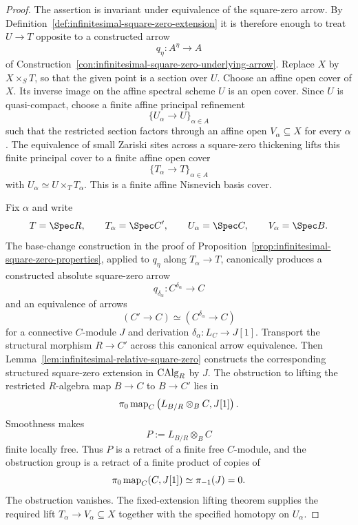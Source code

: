 \begin{proof}
The assertion is invariant under equivalence of the square-zero arrow.  By
Definition~\ref{def:infinitesimal-square-zero-extension} it is therefore
enough to treat \(U\to T\) opposite to a constructed arrow
\[
    q_\eta:A^\eta\longrightarrow A
\]
of Construction~\ref{con:infinitesimal-square-zero-underlying-arrow}.
Replace $X$ by $X\times_ST$, so that the given point is a section over $U$.
Choose an affine open cover of $X$.  Its inverse image on the affine spectral
scheme $U$ is an open cover.  Since $U$ is quasi-compact, choose a finite
affine principal refinement
\[
    \{U_\alpha\to U\}_{\alpha\in A}
\]
such that the restricted section factors through an affine open
$V_\alpha\subseteq X$ for every $\alpha$.  The equivalence of small Zariski
sites across a square-zero thickening lifts this finite principal cover to a
finite affine open cover
\[
    \{T_\alpha\to T\}_{\alpha\in A}
\]
with $U_\alpha\simeq U\times_TT_\alpha$.  This is a finite affine Nisnevich
basis cover.

Fix $\alpha$ and write
\[
    T=\Spec R,
    \qquad
    T_\alpha=\Spec C',
    \qquad
    U_\alpha=\Spec C,
    \qquad
    V_\alpha=\Spec B.
\]
The base-change construction in the proof of
Proposition~\ref{prop:infinitesimal-square-zero-properties}, applied to
\(q_\eta\) along \(T_\alpha\to T\), canonically produces a constructed
absolute square-zero arrow
\[
    q_{\delta_\alpha}:C^{\delta_\alpha}\longrightarrow C
\]
and an equivalence of arrows
\[
    (C'\to C)\simeq
    (C^{\delta_\alpha}\to C)
\]
for a connective \(C\)-module \(J\) and derivation
\(\delta_\alpha:L_C\to J[1]\).  Transport the structural morphism
\(R\to C'\) across this canonical arrow equivalence.  Then
Lemma~\ref{lem:infinitesimal-relative-square-zero} constructs the corresponding
structured square-zero extension in \(\operatorname{CAlg}_R\) by \(J\).
The obstruction to lifting the restricted $R$-algebra map
$B\to C$ to $B\to C'$ lies in
\[
    \pi_0\operatorname{map}_C
    \left(
        L_{B/R}\otimes_BC,
        J[1]
    \right).
\]
Smoothness makes
\[
    P:=L_{B/R}\otimes_BC
\]
finite locally free.  Thus $P$ is a retract of a finite free $C$-module, and
the obstruction group is a retract of a finite product of copies of
\[
    \pi_0\operatorname{map}_C(C,J[1])
    \simeq
    \pi_{-1}(J)
    =0.
\]
The obstruction vanishes.  The fixed-extension lifting theorem supplies the
required lift $T_\alpha\to V_\alpha\subseteq X$ together with the specified
homotopy on $U_\alpha$.
\end{proof}

